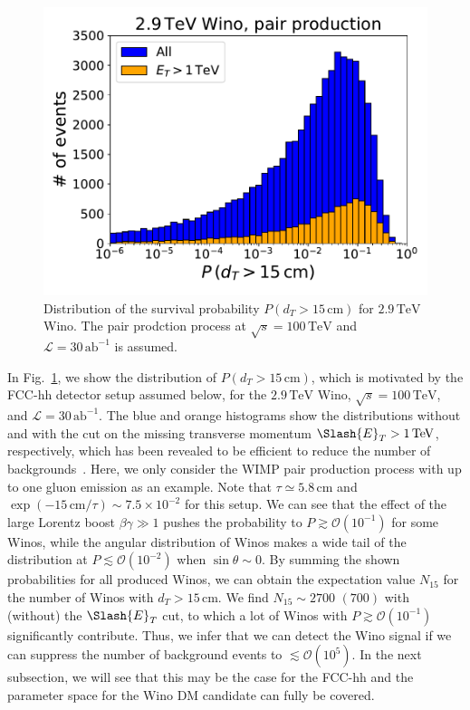 \documentclass[12pt,twoside,book]{article}
\begin{document}
\begin{figure}[t]
  \centering
  \includegraphics[width=0.5\hsize]{survival_probability.pdf}
  \caption{
    Distribution of the survival probability $P(d_T > 15\,\mathrm{cm})$ for $2.9\,\mathrm{TeV}$ Wino.
    The pair prodction process at $\sqrt{s}=100\,\mathrm{TeV}$ and $\mathcal{L} = 30\,\mathrm{ab}^{-1}$ is assumed.}
  \label{fig:survival_probability}
\end{figure}

In Fig.~\ref{fig:survival_probability}, we show the distribution of $P(d_T > 15\,\mathrm{cm})$, which is motivated by the FCC-hh detector setup assumed below, for the $2.9\,\mathrm{TeV}$ Wino, $\sqrt{s} = 100\,\mathrm{TeV}$, and $\mathcal{L} = 30\,\mathrm{ab}^{-1}$.
The blue and orange histograms show the distributions without and with the cut on the missing transverse momentum $\Slash{E}_T > 1\,\mathrm{TeV}$, respectively, which has been revealed to be efficient to reduce the number of backgrounds~\cite{Asai:2019wst}.
Here, we only consider the WIMP pair production process with up to one gluon emission as an example.
Note that $\tau \simeq 5.8\,\mathrm{cm}$ and $\exp (-15\,\mathrm{cm} / \tau) \sim 7.5\times 10^{-2}$ for this setup.
We can see that the effect of the large Lorentz boost $\beta \gamma \gg 1$ pushes the probability to $P \gtrsim \mathcal{O} (10^{-1})$ for some Winos, while the angular distribution of Winos makes a wide tail of the distribution at $P \lesssim \mathcal{O} (10^{-2})$ when $\sin\theta \sim 0$.
By summing the shown probabilities for all produced Winos, we can obtain the expectation value $N_{15}$ for the number of Winos with $d_T > 15\,\mathrm{cm}$.
We find $N_{15} \sim 2700$ $(700)$ with (without) the $\Slash{E}_T$ cut, to which a lot of Winos with $P \gtrsim \mathcal{O} (10^{-1})$ significantly contribute.
Thus, we infer that we can detect the Wino signal if we can suppress the number of background events to $\lesssim \mathcal{O}(10^5)$.
In the next subsection, we will see that this may be the case for the FCC-hh and the parameter space for the Wino DM candidate can fully be covered.
\end{document}
